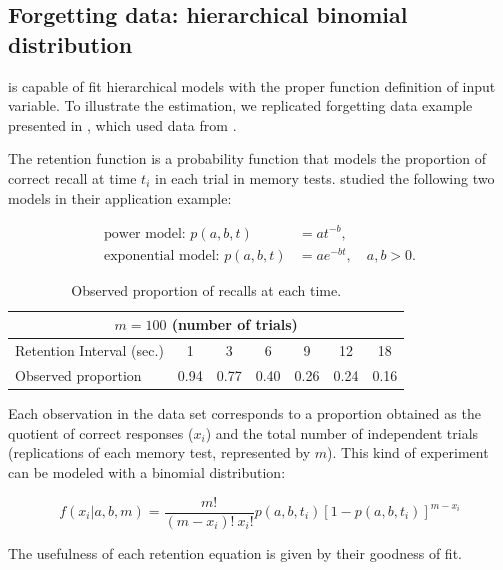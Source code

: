 \documentclass[nojss]{jss}
\begin{document}
\subsection{Forgetting data: hierarchical binomial distribution}

 is capable of fit hierarchical models with the proper function definition of input variable. To illustrate the estimation, we replicated forgetting data example presented in \cite{Myung2003}, which used data from \cite{MurdockBennetB.1961}.

The retention function is a probability function that models the proportion of correct recall at time $t_i$ in each trial in memory tests. \cite{Myung2003} studied the following two models in their application example:

\begin{equation}\label{priors}
  \begin{split}
    \text{power model: }p(a, b, t) & = at^{-b}, \\
    \text{exponential model: }p(a, b, t) & = ae^{-b t}, \quad a, b > 0.
  \end{split}
\end{equation}

\begin{table}[h!]
\centering
\begin{tabular}{|l|cccccc|}
\hline
\multicolumn{7}{|c|}{$m=100$ (number of trials)}                      \\ \hline
Retention Interval (sec.) & 1    & 3    & 6    & 9    & 12   & 18   \\ \hline
Observed proportion       & 0.94 & 0.77 & 0.40 & 0.26 & 0.24 & 0.16 \\ \hline
\end{tabular}
\caption{Observed proportion of recalls at each time.}
\end{table}

Each observation in the data set corresponds to a proportion obtained as the quotient of correct responses ($x_i$) and the total number of independent trials (replications of each memory test, represented by $m$). This kind of experiment can be modeled with a binomial distribution:

\begin{equation} \label{posterior}
  f(x_i|a, b, m) = \frac{m!}{(m-x_i)!\: x_i!}p(a, b, t_i) \left[ 1-p(a, b, t_i) \right]^{m-x_i}
\end{equation}

The usefulness of each retention equation is given by their goodness of fit.
\end{document}
